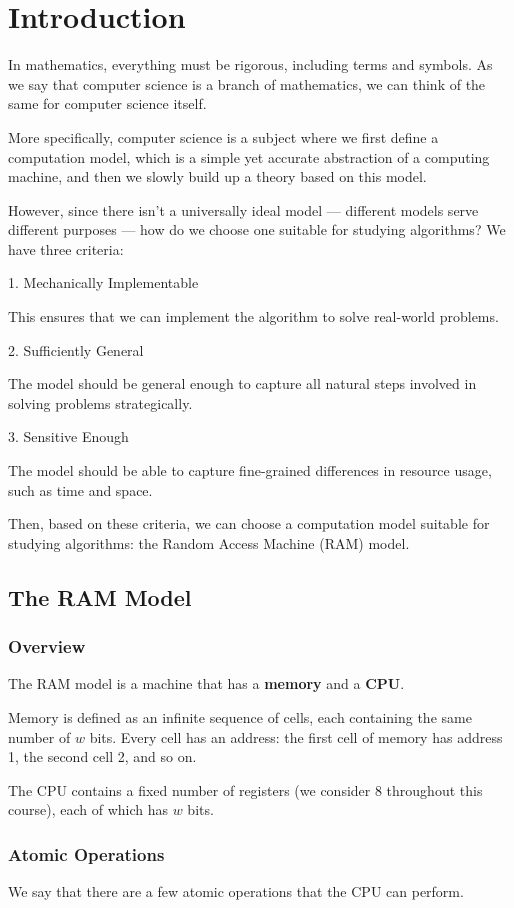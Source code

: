 \chapter{Introduction}

In mathematics, everything must be rigorous, including terms and symbols. As we say that computer science is a branch of mathematics, we can think of the same for computer science itself.

More specifically, computer science is a subject where we first define a computation model, which is a simple yet accurate abstraction of a computing machine, and then we slowly build up a theory based on this model.

However, since there isn’t a universally ideal model — different models serve different purposes — how do we choose one suitable for studying algorithms? We have three criteria:

1. Mechanically Implementable

This ensures that we can implement the algorithm to solve real-world problems.

2. Sufficiently General

The model should be general enough to capture all natural steps involved in solving problems strategically.

3. Sensitive Enough

The model should be able to capture fine-grained differences in resource usage, such as time and space.

Then, based on these criteria, we can choose a computation model suitable for studying algorithms: the Random Access Machine (RAM) model.

\section{The RAM Model}
\subsection{Overview}
The RAM model is a machine that has a \textbf{memory} and a \textbf{CPU}. 

Memory is defined as an infinite sequence of cells, each containing the same number of \(w\) bits. Every cell has an address: the first cell of memory has address 1, the second cell 2, and so on. 

The CPU contains a fixed number of registers (we consider 8 throughout this course), each of which has \(w\) bits. 

\subsection{Atomic Operations}
We say that there are a few atomic operations that the CPU can perform. 

